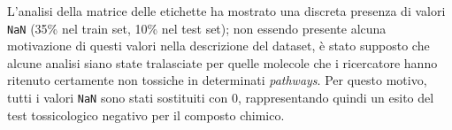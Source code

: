 L'analisi della matrice delle etichette ha mostrato una discreta presenza di valori \texttt{NaN} (35\% nel train set, 10\% nel test set); non essendo presente alcuna motivazione di questi valori nella descrizione del dataset, è stato supposto che alcune analisi siano state tralasciate per quelle molecole che i ricercatore hanno ritenuto certamente non tossiche in determinati \textit{pathways}. Per questo motivo, tutti i valori \texttt{NaN} sono stati sostituiti con $0$, rappresentando quindi un esito del test tossicologico negativo per il composto chimico.\\
\begin{figure}[!ht]
	\centering
	\quad
	\quad
	\quad
	\\	\quad
	\quad

\end{figure}
